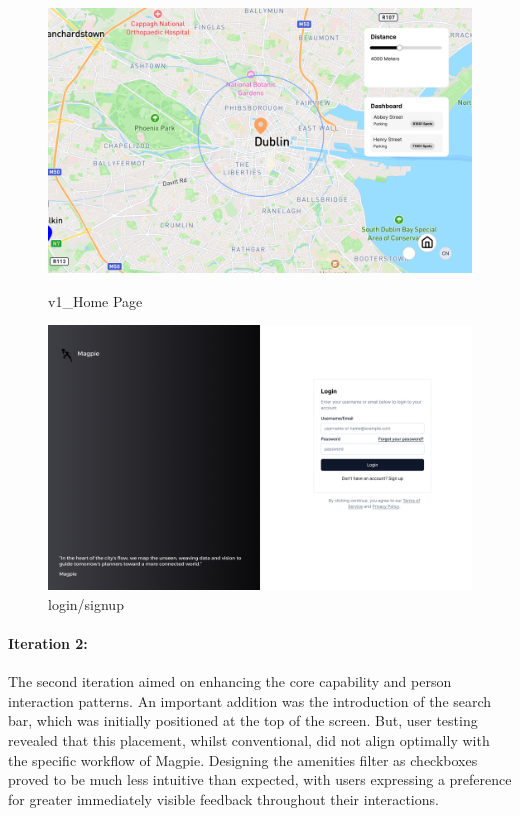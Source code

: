 \begin{figure}[htbp]
    \centering
    \begin{minipage}{0.48\textwidth}
        \centering
        \includegraphics[width=\textwidth]{images/v1_Home Page.png}
        \caption{v1\_Home Page}
        \label{fig:v1_Home Page}
    \end{minipage}
    \hfill
    \begin{minipage}{0.48\textwidth}
        \centering
        \includegraphics[width=\textwidth]{images/v1_Login.png}
        \caption{login/signup}
        \label{fig:v1 Login}
    \end{minipage}
\end{figure}


\paragraph{Iteration 2:}
The second iteration aimed on enhancing the core capability and person
interaction patterns. An important addition was the introduction of the
search bar, which was initially positioned at the top of the screen. But, user
testing revealed that this placement, whilst conventional, did not align
optimally with the specific workflow of Magpie. Designing the amenities filter 
as checkboxes proved to be much less intuitive than expected, with users
expressing a preference for greater immediately visible feedback throughout 
their interactions.

